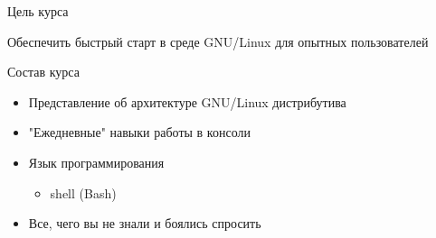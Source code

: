 \begin{frame}{Цель курса}
	\begin{center}
		\Huge
		Обеспечить быстрый старт в среде GNU/Linux для опытных пользователей
	\end{center}
\end{frame}


\begin{frame}{Состав курса}
	\begin{itemize}
		\item Представление об архитектуре GNU/Linux дистрибутива
			\pause
		\item "Ежедневные" навыки работы в консоли
			\pause
		\item Язык программирования
			\begin{itemize}
					\item shell (Bash)
			\end{itemize}
			\pause
		\item Все, чего вы не знали и боялись спросить
	\end{itemize}
\end{frame}
